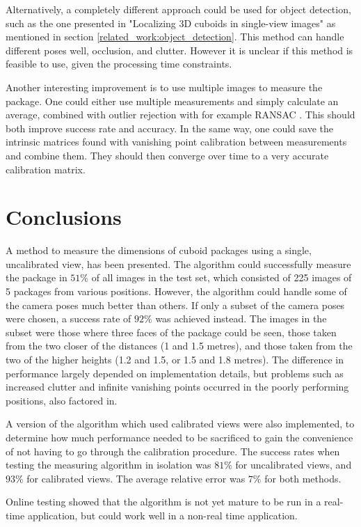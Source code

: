 Alternatively, a completely different approach could be used for object detection, such as the one presented in "Localizing 3D cuboids in single-view images" as mentioned in section \ref{related_work:object_detection}.
This method can handle different poses well, occlusion, and clutter.
However it is unclear if this method is feasible to use, given the processing time constraints.

Another interesting improvement is to use multiple images to measure the package.
One could either use multiple measurements and simply calculate an average, combined with outlier rejection with for example RANSAC \cite{fischler1981random}.
This should both improve success rate and accuracy.
In the same way, one could save the intrinsic matrices found with vanishing point calibration between measurements and combine them.
They should then converge over time to a very accurate calibration matrix. 


\section{Conclusions}
A method to measure the dimensions of cuboid packages using a single, uncalibrated view, has been presented.
The algorithm could successfully measure the package in $51\%$ of all images in the test set, which consisted of 225 images of 5 packages from various positions.
However, the algorithm could handle some of the camera poses much better than others.
If only a subset of the camera poses were chosen, a success rate of $92\%$ was achieved instead.
The images in the subset were those where three faces of the package could be seen, those taken from the two closer of the distances (1 and 1.5 metres), and those taken from the two of the higher heights (1.2 and 1.5, or 1.5 and 1.8 metres).
The difference in performance largely depended on implementation details, but problems such as increased clutter and infinite vanishing points occurred in the poorly performing positions, also factored in.

A version of the algorithm which used calibrated views were also implemented, to determine how much performance needed to be sacrificed to gain the convenience of not having to go through the calibration procedure.
The success rates when testing the measuring algorithm in isolation was $81\%$ for uncalibrated views, and $93\%$ for calibrated views.
The average relative error was $7\%$ for both methods.

Online testing showed that the algorithm is not yet mature to be run in a real-time application, but could work well in a non-real time application.





